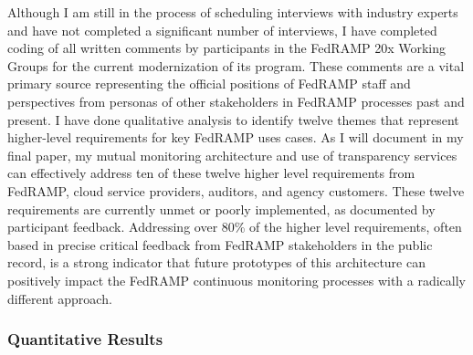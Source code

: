Although I am still in the process of scheduling interviews with industry experts and have not completed a significant number of interviews, I have completed coding of all written comments by participants in the FedRAMP 20x Working Groups for the current modernization of its program. These comments are a vital primary source representing the official positions of FedRAMP staff and perspectives from personas of other stakeholders in FedRAMP processes past and present. I have done qualitative analysis to identify twelve themes that represent higher-level requirements for key FedRAMP uses cases. As I will document in my final paper, my mutual monitoring architecture and use of transparency services can effectively address ten of these twelve higher level requirements from FedRAMP, cloud service providers, auditors, and agency customers. These twelve requirements are currently unmet or poorly implemented, as documented by participant feedback. Addressing over 80\% of the higher level requirements, often based in precise critical feedback from FedRAMP stakeholders in the public record, is a strong indicator that future prototypes of this architecture can positively impact the FedRAMP continuous monitoring processes with a radically different approach.

\subsubsection*{Quantitative Results}

